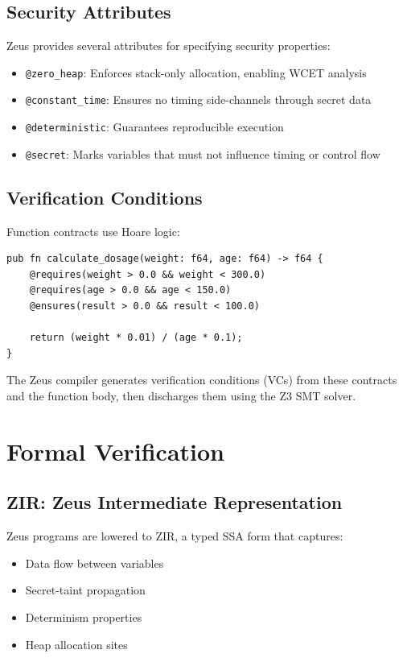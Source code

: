\documentclass[sigplan,screen]{acmart}
\begin{document}
\subsection{Security Attributes}

Zeus provides several attributes for specifying security properties:

\begin{itemize}
\item \texttt{@zero\_heap}: Enforces stack-only allocation, enabling WCET analysis
\item \texttt{@constant\_time}: Ensures no timing side-channels through secret data
\item \texttt{@deterministic}: Guarantees reproducible execution
\item \texttt{@secret}: Marks variables that must not influence timing or control flow
\end{itemize}

\subsection{Verification Conditions}

Function contracts use Hoare logic:

\begin{lstlisting}[language=Zeus]
pub fn calculate_dosage(weight: f64, age: f64) -> f64 {
    @requires(weight > 0.0 && weight < 300.0)
    @requires(age > 0.0 && age < 150.0)
    @ensures(result > 0.0 && result < 100.0)
    
    return (weight * 0.01) / (age * 0.1);
}
\end{lstlisting}

The Zeus compiler generates verification conditions (VCs) from these contracts and the function body, then discharges them using the Z3 SMT solver.

\section{Formal Verification}

\subsection{ZIR: Zeus Intermediate Representation}

Zeus programs are lowered to ZIR, a typed SSA form that captures:
\begin{itemize}
\item Data flow between variables
\item Secret-taint propagation
\item Determinism properties
\item Heap allocation sites
\end{itemize}
\end{document}
